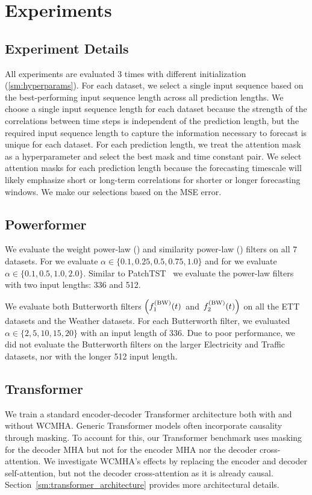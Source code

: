 \section{Experiments}

\subsection{Experiment Details}
\label{sm:exp_details}

All experiments are evaluated 3 times with different initialization (\ref{sm:hyperparams}).
For each dataset, we select a single input sequence based on the best-performing input sequence length across all prediction lengths.
We choose a single input sequence length for each dataset because the strength of the correlations between time steps is independent of the prediction length, but the required input sequence length to capture the information necessary to forecast is unique for each dataset.
For each prediction length, we treat the attention mask as a hyperparameter and select the best mask and time constant pair.
We select attention masks for each prediction length because the forecasting timescale will likely emphasize short or long-term correlations for shorter or longer forecasting windows.
We make our selections based on the MSE error.

\subsection{Powerformer}
\label{sm:experiments_powerformer}
We evaluate the weight power-law (\fpl) and similarity power-law (\fspl) filters on all 7 datasets.
For \fpl{} we evaluate $\alpha \in \{ 0.1, 0.25, 0.5, 0.75, 1.0 \}$ and for \fspl{} we evaluate $\alpha \in \{ 0.1, 0.5, 1.0, 2.0 \}$.
Similar to PatchTST~\cite{nie.patchtst.2023a} we evaluate the power-law filters with two input lengths: 336 and 512.

We evaluate both Butterworth filters $\left( f^{(\text{BW})}_1(t) \right.$ and $\left. f^{(\text{BW})}_2(t) \right)$ on all the ETT datasets and the Weather datasets.
For each Butterworth filter, we evaluated $\alpha \in \{ 2, 5, 10, 15, 20 \}$ with an input length of 336.
Due to poor performance, we did not evaluate the Butterworth filters on the larger Electricity and Traffic datasets, nor with the longer 512 input length.


\subsection{Transformer}
\label{sm:experiments_transformer}
We train a standard encoder-decoder Transformer architecture both with and without WCMHA.
Generic Transformer models often incorporate causality through masking.
To account for this, our Transformer benchmark uses masking for the decoder MHA but not for the encoder MHA nor the decoder cross-attention.
We investigate WCMHA's effects by replacing the encoder and decoder self-attention, but not the decoder cross-attention as it is already causal.
Section~\ref{sm:transformer_architecture} provides more architectural details.

